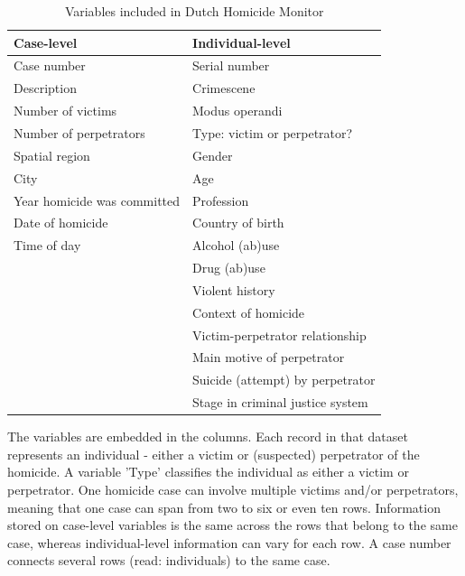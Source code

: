 \vspace{10pt}
\begin{table}[H]
\small
\centering
\begin{tabular}{@{}ll@{}}
\toprule
Case-level                  & Individual-level                 \\ \midrule
Case number                 & Serial number                    \\
Description                 & Crimescene                       \\
Number of victims           & Modus operandi                   \\
Number of perpetrators      & Type: victim or perpetrator?     \\
Spatial region              & Gender                           \\
City                        & Age                              \\
Year homicide was committed & Profession                       \\
Date of homicide            & Country of birth                 \\
Time of day                 & Alcohol (ab)use                  \\
                            & Drug (ab)use                     \\
                            & Violent history                  \\
                            & Context of homicide              \\
                            & Victim-perpetrator relationship  \\
                            & Main motive of perpetrator       \\
                            & Suicide (attempt) by perpetrator \\
                            & Stage in criminal justice system         \\ \bottomrule
\end{tabular}
\caption{Variables included in Dutch Homicide Monitor}
\label{tab:my-table}
\end{table}
\vspace{10pt}


The variables are embedded in the columns. Each record in that dataset represents an individual - either a victim or (suspected) perpetrator of the homicide. A variable 'Type' classifies the individual as either a victim or perpetrator. One homicide case can involve multiple victims and/or perpetrators, meaning that one case can span from two to six or even ten rows. Information stored on case-level variables is the same across the rows that belong to the same case, whereas individual-level information can vary for each row. A case number connects several rows (read: individuals) to the same case. 

